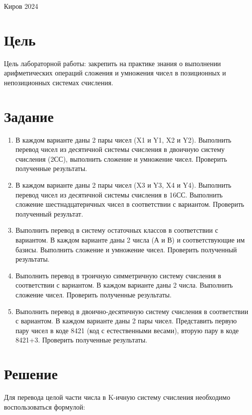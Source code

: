 \documentclass[a4paper,14pt]{extarticle}
\begin{document}
	\begin{center}
		Киров 2024
	\end{center}
	
	\newpage
	\section*{Цель}
	Цель лабораторной работы: закрепить на практике знания о выполнении арифметических операций сложения и умножения чисел в позиционных и непозиционных системах счисления.
	
	\section*{Задание}
	\begin{enumerate}
		\item В каждом варианте даны 2 пары чисел (X1 и Y1, X2 и Y2).  Выполнить перевод чисел из десятичной системы счисления в двоичную систему счисления (2СС), выполнить сложение и умножение чисел. Проверить полученные результаты.
		
		\item  В каждом варианте даны 2 пары чисел (X3 и Y3, X4 и Y4). Выполнить перевод чисел из десятичной системы счисления в 16СС.  Выполнить сложение шестнадцатеричных чисел в соответствии с вариантом. Проверить полученный результат.
		
		\item Выполнить перевод в систему остаточных классов в соответствии с вариантом. В каждом варианте даны 2 числа (А и В) и соответствующие им базисы. Выполнить сложение и умножение чисел. Проверить полученный результаты.
		
		\item Выполнить перевод в троичную симметричную систему счисления в соответствии с вариантом. В каждом варианте даны 2 числа. Выполнить сложение чисел. Проверить полученные результаты.
		
		\item Выполнить перевод в двоично-десятичную систему счисления в соответствии с вариантом. В каждом варианте даны 2 пары чисел. Представить первую пару чисел в коде 8421 (код с естественными весами), вторую пару в коде 8421+3. Проверить полученные результаты.
	\end{enumerate}
	
	\section*{Решение}
	Для перевода целой части числа в K-ичную систему счисления необходимо воспользоваться формулой:
	
\end{document}
